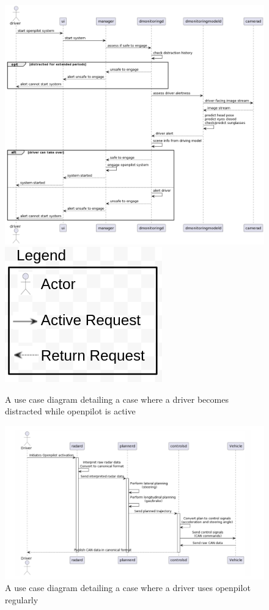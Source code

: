 \documentclass[12pt]{article}
\begin{document}
\begin{figure}[ht]
    \includegraphics[scale=0.15]{Assets/sequence.png}
    \\
    \includegraphics[scale=0.15]{Assets/legend.png}
    \centering
    \caption{A use case diagram detailing a case where a driver becomes distracted while openpilot is active}
    \label{fig:enter-label}
\end{figure}


\begin{figure}[ht]
    \includegraphics[scale=0.3]{Assets/usecase.png}
    \centering
    \caption{A use case diagram detailing a case where a driver uses openpilot regularly}
    \label{fig:enter-label}
\end{figure}
\end{document}
